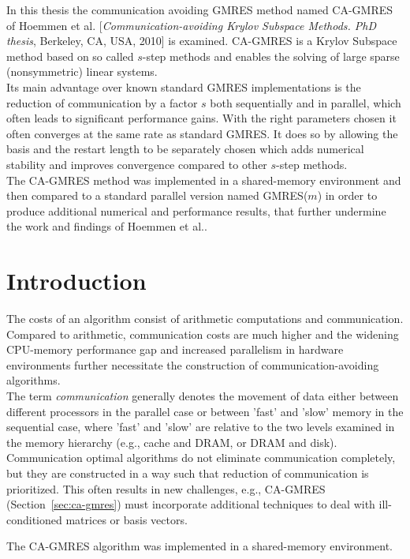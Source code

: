 \documentclass{scrartcl}
\numberwithin{equation}{section}
\begin{document}
\begin{onecolabstract}
In this thesis the communication avoiding GMRES method named CA-GMRES of Hoemmen et al. [\textit{Communication-avoiding Krylov Subspace Methods. PhD thesis}, Berkeley, CA, USA, 2010] is examined. CA-GMRES is a Krylov Subspace method based on so called $s$-step methods and enables the solving of large sparse (nonsymmetric) linear systems.\\ Its main advantage over known standard GMRES implementations is the reduction of communication by a factor $s$ both sequentially and in parallel, which often leads to significant performance gains. With the right parameters chosen it often converges at the same rate as standard GMRES. It does so by allowing the basis and the restart length to be separately chosen which adds numerical stability and improves convergence compared to other $s$-step methods.\\ The CA-GMRES method was implemented in a shared-memory environment and then compared to a standard parallel version named GMRES($m$) in order to produce additional numerical and performance results, that further undermine the work and findings of Hoemmen et al..
\end{onecolabstract}

\section{Introduction}
The costs of an algorithm consist of arithmetic computations and communication.
Compared to arithmetic, communication costs are much higher and the widening CPU-memory performance gap and increased parallelism in hardware environments further necessitate the construction of communication-avoiding algorithms.\\

The term \textit{communication} generally denotes the movement of data either between different processors in the parallel case or between 'fast' and 'slow' memory in the sequential case, where 'fast' and 'slow' are relative to the two levels examined in the memory hierarchy (e.g., cache and DRAM, or DRAM and disk). Communication optimal algorithms do not eliminate communication completely, but they are constructed in a way such that reduction of communication is prioritized. This often results in new challenges, e.g., CA-GMRES (Section~\ref{sec:ca-gmres}) must incorporate additional techniques to deal with ill-conditioned matrices or basis vectors.


The CA-GMRES algorithm was implemented in a shared-memory environment.
\end{document}
